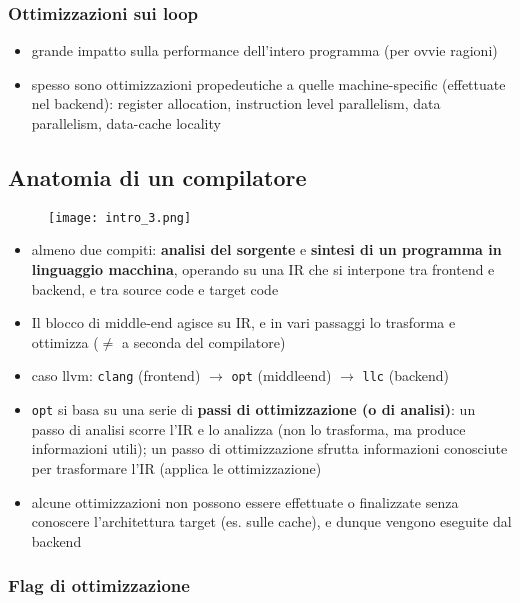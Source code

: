 \subsubsection{Ottimizzazioni sui loop}

\begin{itemize}
  \item grande impatto sulla performance dell'intero programma (per ovvie ragioni)
  \item spesso sono ottimizzazioni propedeutiche a quelle machine-specific (effettuate nel backend): register allocation, instruction level parallelism, data parallelism, data-cache locality
\end{itemize}

\subsection{Anatomia di un compilatore}

\begin{figure}[h]
  \centering
  \texttt{[image: intro\_3.png]}
\end{figure}

\begin{itemize}
  \item almeno due compiti: \textbf{analisi del sorgente} e \textbf{sintesi di un programma in linguaggio macchina}, operando su una IR che si interpone tra frontend e backend, e tra source code e target code
  \item Il blocco di middle-end agisce su IR, e in vari passaggi lo trasforma e ottimizza ($\neq$ a seconda del compilatore)
  \item caso llvm: \lstinline|clang| (frontend) $\rightarrow$ \lstinline|opt| (middleend) $\rightarrow$ \lstinline|llc| (backend)
  \item \lstinline|opt| si basa su una serie di \textbf{passi di ottimizzazione (o di analisi)}: un passo di analisi scorre l'IR e lo analizza (non lo trasforma, ma produce informazioni utili); un passo di ottimizzazione sfrutta informazioni conosciute per trasformare l'IR (applica le ottimizzazione)
  \item alcune ottimizzazioni non possono essere effettuate o finalizzate senza conoscere l'architettura target (es. sulle cache), e dunque vengono eseguite dal backend
\end{itemize}

\subsubsection{Flag di ottimizzazione}

